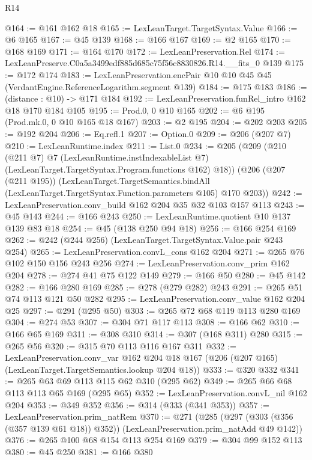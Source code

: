 \begin{lexlean}{R14}
\begin{coremodule}
@164 := @161 @162 @18
@165 := LexLeanTarget.TargetSyntax.Value
@166 := @6 @165
@167 := @45 @139
@168 := @166 @167
@169 := @2 @165
@170 := @168 @169
@171 := @164 @170
@172 := LexLeanPreservation.Rel
@174 := LexLeanPreserve.C0a5a3499edf885d685c75f56c8830826.R14.__fits_0 @139
@175 := @172 @174
@183 := LexLeanPreservation.encPair @10 @10 @45 @45 (VerdantEngine.ReferenceLogarithm.segment @139)
@184 := @175 @183
@186 := (distance : @10) -> @171 @184
@192 := LexLeanPreservation.funRel_intro @162 @18 @170 @184 @105
@195 := Prod.{0, 0} @10 @165
@202 := @6 @195 (Prod.mk.{0, 0} @10 @165 @18 @167)
@203 := @2 @195
@204 := @202 @203
@205 := @192 @204
@206 := Eq.refl.{1}
@207 := Option.{0}
@209 := @206 (@207 @7)
@210 := LexLeanRuntime.index
@211 := List.{0}
@234 := @205
    (@209
      (@210
        (@211 @7)
        @7
        (LexLeanRuntime.instIndexableList @7)
        (LexLeanTarget.TargetSyntax.Program.functions @162)
        @18))
    (@206
      (@207 (@211 @195))
      (LexLeanTarget.TargetSemantics.bindAll
        (LexLeanTarget.TargetSyntax.Function.parameters @105)
        @170
        @203))
@242 := LexLeanPreservation.conv_build @162 @204 @35 @32 @103 @157 @113
@243 := @45 @143
@244 := @166 @243
@250 := LexLeanRuntime.quotient @10 @137 @139 @83 @18
@254 := @45 (@138 @250 @94 @18)
@256 := @166 @254 @169
@262 := @242 (@244 @256) (LexLeanTarget.TargetSyntax.Value.pair @243 @254)
@265 := LexLeanPreservation.convL_cons @162 @204
@271 := @265 @76 @102 @150 @156 @243 @256
@274 := LexLeanPreservation.conv_prim @162 @204
@278 := @274 @41 @75 @122 @149
@279 := @166 @50
@280 := @45 @142
@282 := @166 @280 @169
@285 := @278 (@279 @282) @243
@291 := @265 @51 @74 @113 @121 @50 @282
@295 := LexLeanPreservation.conv_value @162 @204 @25
@297 := @291 (@295 @50)
@303 := @265 @72 @68 @119 @113 @280 @169
@304 := @274 @53
@307 := @304 @71 @117 @113
@308 := @166 @62
@310 := @166 @65 @169
@311 := @308 @310
@314 := @307 (@168 @311) @280
@315 := @265 @56
@320 := @315 @70 @113 @116 @167 @311
@332 := LexLeanPreservation.conv_var
    @162
    @204
    @18
    @167
    (@206 (@207 @165) (LexLeanTarget.TargetSemantics.lookup @204 @18))
@333 := @320 @332
@341 := @265 @63 @69 @113 @115 @62 @310 (@295 @62)
@349 := @265 @66 @68 @113 @113 @65 @169 (@295 @65)
@352 := LexLeanPreservation.convL_nil @162 @204
@353 := @349 @352
@356 := @314 (@333 (@341 @353))
@357 := LexLeanPreservation.prim_natRem
@370 := @271
    (@285 (@297 (@303 (@356 (@357 @139 @61 @18)) @352)) (LexLeanPreservation.prim_natAdd @49 @142))
@376 := @265 @100 @68 @154 @113 @254 @169
@379 := @304 @99 @152 @113
@380 := @45 @250
@381 := @166 @380

\end{coremodule}
\end{lexlean}
